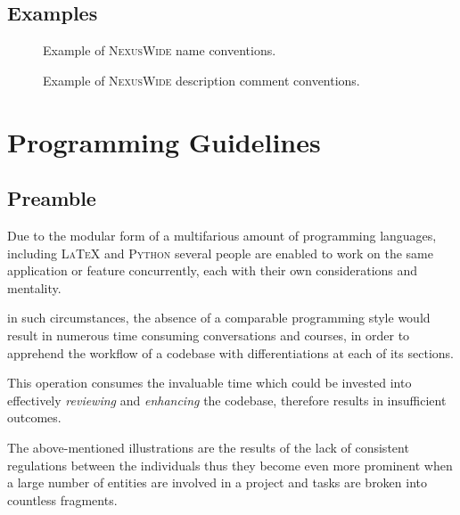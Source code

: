 \documentclass[13pt]{scrarticle}
\newcommand{\header}[1]{ \textsf{#1} \relax{}}
\newcommand{\important}[1]{\textit{#1}}
\newcommand{\name}[1]{{\textsc{#1}}}
\begin{document}
    \newpage
    \subsection{\header{Examples}}

        \begin{figure}[h!]
            \caption{Example of \name{NexusWide} name conventions.}
        \end{figure}

        \begin{figure}[h!]
            \caption{Example of \name{NexusWide} description comment conventions.}
        \end{figure}


    \section{\header{Programming Guidelines}}
    \subsection{\header{Preamble}}


    Due to the modular form of a multifarious amount of programming languages,
    including \name{\LaTeX} and \name{Python}\footnotemark{}
    several people are enabled to work on the same application or feature concurrently,
    each with their own considerations and mentality. \newline

    in such circumstances, the absence of a comparable programming style would result in numerous time consuming conversations and courses,
    in order to apprehend the workflow of a codebase with differentiations at each of its sections. \newline

    This operation consumes the invaluable time which could be invested into effectively \important{reviewing} and \important{enhancing} the codebase,
    therefore results in insufficient outcomes. \newline


    The above-mentioned illustrations are the results of the lack of consistent regulations between the individuals
    thus they become even more prominent when a large number of entities are involved in a project
    and tasks are broken into countless fragments.
    \newline
\end{document}
